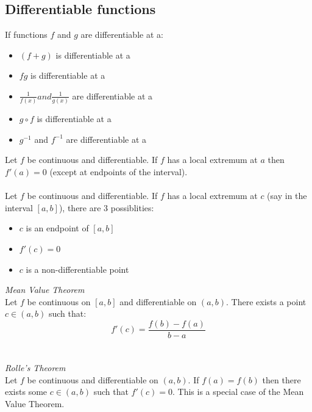 \documentclass{article}
\begin{document}
\subsection{Differentiable functions}
If functions $ f $ and $ g $ are differentiable at a:
\begin{itemize}
\item $ (f + g) $ is differentiable at a
\item $ fg $ is differentiable at a
\item $ \frac{1}{f(x)} and \frac{1}{g(x)} $ are differentiable at a
\item $ g \circ f $ is differentiable at a
\item $ g^{-1} $ and $ f^{-1} $ are differentiable at a
\end{itemize}
Let $ f $ be continuous and differentiable. If $ f $ has a local extremum at $ a $ then $ f'(a) = 0 $ (except at endpoints of the interval).
\\\\
Let $ f $ be continuous and differentiable. If $ f $ has a local extremum at $ c $ (say in the interval $ [a, b] $), there are 3 possiblities:
\begin{itemize}
\item $ c $ is an endpoint of $ [a, b] $
\item $ f'(c) = 0 $
\item $ c $ is a non-differentiable point
\end{itemize}
\textit{Mean Value Theorem}
\\
Let $ f $ be continuous on $ [a, b] $ and differentiable on $ (a, b) $. There exists a point $ c \in (a, b) $ such that:
\begin{equation}
f'(c) = \frac{f(b) - f(a)}{b - a}
\end{equation}
\\\\
\textit{Rolle's Theorem}
\\
Let $ f $ be continuous and differentiable on $ (a, b) $. If $ f(a) = f(b) $ then there exists some $ c \in (a, b) $ such that $ f'(c) = 0 $. This is a special case of the Mean Value Theorem.
\end{document}
